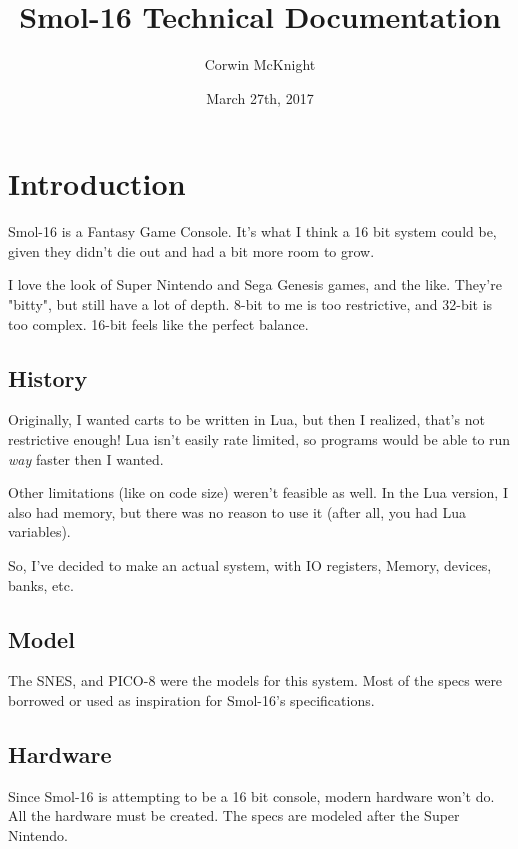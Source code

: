 \documentclass[10pt,a4paper]{article}
\author{Corwin McKnight}
\title{Smol-16 Technical Documentation}
\date{March 27th, 2017}
\newcommand{\titalic}[1]{\textit{#1}}
\begin{document}
	
	\begin{titlepage}
	\maketitle
	\end{titlepage}

	\tableofcontents
	\newpage
	
	
	\section{Introduction}
		
		Smol-16 is a Fantasy Game Console. It's what I think a 16 bit system could be, given they didn't die out and had a bit more room to grow.
		
		I love the look of Super Nintendo and Sega Genesis games, and the like. They're "bitty", but still have a lot of depth. 8-bit to me is too restrictive, and 32-bit is too complex. 16-bit feels like the perfect balance.
		
		\subsection{History}
		Originally, I wanted carts to be written in Lua, but then I realized, that's not restrictive enough! Lua isn't easily rate limited, so programs would be able to run \titalic{way} faster then I wanted. 
		
		Other limitations (like on code size) weren't feasible as well. In the Lua version, I also had memory, but there was no reason to use it (after all, you had Lua variables).
		
		So, I've decided to make an actual system, with IO registers, Memory, devices, banks, etc.
		
		\subsection{Model}
			The SNES, and PICO-8 were the models for this system. Most of the specs were borrowed or 	used as inspiration for Smol-16's specifications.
			
		\subsection{Hardware}
		Since Smol-16 is attempting to be a 16 bit console, modern hardware won't do. All the hardware must be created. The specs are modeled after the Super Nintendo.
\end{document}
